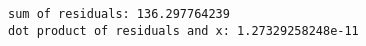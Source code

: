 \documentclass{article}
\begin{document}
    \begin{Verbatim}[commandchars=\\\{\}]
sum of residuals: 136.297764239
dot product of residuals and x: 1.27329258248e-11
    \end{Verbatim}


    
    
    
    
\end{document}
